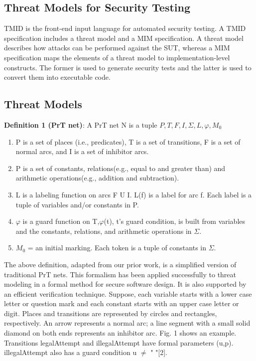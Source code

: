 \begin{center}
\section{Threat Models for Security Testing}
\end{center}
TMID is the front-end input language for automated security testing. A TMID specification includes a threat model and a MIM specification. A threat model describes how attacks can be performed against the SUT, whereas a MIM specification maps the elements of a threat model to implementation-level constructs. The former is used to generate security tests and the latter is used to convert them into executable code.
\subsection{Threat Models}
\textbf{Definition 1 (PrT net)}:
 A PrT net N is a tuple $P,T,F,I,\Sigma,L,\varphi,M_0$
\begin{enumerate}
\item P is a set of places (i.e., predicates), T is a set of
transitions, F is a set of normal arcs, and I is a set of
inhibitor arcs.
\item P is a set of constants, relations(e.g., equal to and
greater than) and arithmetic operations(e.g., addition
and subtraction).
\item L is a labeling function on arcs F U I. L(f) is a label for
arc f. Each label is a tuple of variables and/or
constants in P.
\item $\varphi$ is a guard function on T,$\varphi$(t), t\rq s guard condition, is
built from variables and the constants, relations, and
arithmetic operations in $\Sigma$.
\item $M_0$ = an initial marking. Each token is a tuple of
constants in $\Sigma$.
\end{enumerate}
The above definition, adapted from our prior work, is a simplified version of traditional PrT nets. This formalism has been applied successfully to threat modeling in a formal method for secure software design. It is also supported by an efficient verification technique. Suppose, each variable starts with a lower case letter or question mark and each constant starts with an upper
case letter or digit. Places and transitions are represented by circles and rectangles, respectively. An arrow represents a normal arc; a line segment with a small solid diamond on both ends represents an inhibitor arc. Fig. 1 shows an example. Transitions legalAttempt and illegalAttempt have formal parameters (u,p). illegalAttempt also has a guard condition u $\neq$ " "[2].

